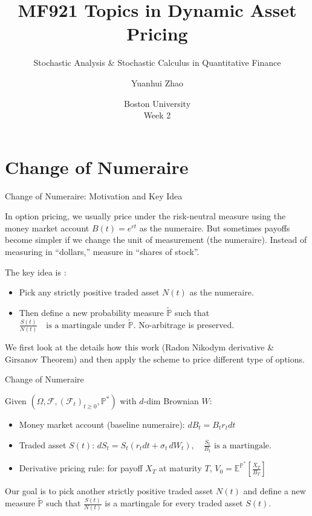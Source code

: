 \documentclass{beamer}
\title{MF921 Topics in Dynamic Asset Pricing}
\subtitle{Stochastic Analysis \& Stochastic Calculus in Quantitative Finance}
\author{Yuanhui Zhao}
\date{Boston University\\Week 2}
\begin{document}
\frame{\titlepage}
\section{Change of Numeraire}
\begin{frame}{Change of Numeraire: Motivation and Key Idea}
    \par In option pricing, we usually price under the risk-neutral measure using 
    the money market account $B(t) = e^{rt}$ as the numeraire. 
    But sometimes payoffs become simpler if we change the unit of measurement (the numeraire).
    Instead of measuring in “dollars,” measure in “shares of stock”.
    \vspace{1em}
    \par The key idea is :
    \begin{itemize}
        \item Pick any strictly positive traded asset $N(t)$ as the numeraire.
        \item Then define a new probability measure $\tilde{\mathbb{P}}$ such that 
        $\frac{S(t)}{N(t)} \quad \text{is a martingale under } \tilde{\mathbb{P}}.$ No-arbitrage is preserved.
    \end{itemize}
    \vspace{1em}
    \par We first look at the details how this work (Radon Nikodym derivative \& Girsanov Theorem) and 
    then apply the scheme to price different type of options. 
\end{frame}
\begin{frame}{Change of Numeraire}
    \par Given $(\Omega, \mathcal{F}, (\mathcal{F}_t)_{t \geq 0}, \mathbb{P}^*)$ with $d$-dim Brownian $W$:
    \vspace{1em}
    \begin{itemize}
        \item Money market account (baseline numeraire): $ dB_t =  B_t r_t dt$
        \item Traded asset $S(t)$: $dS_t = S_t(r_t dt + \sigma_t\, dW_t),
    \quad \tfrac{S_t}{B_t} \text{ is a martingale.}$
        \item Derivative pricing rule: for payoff $X_T$ at maturity $T$, $V_0 = \mathbb{E}^{\mathbb{P}^*}\left[\frac{X_T}{B_T}\right]$
    \end{itemize}
    \vspace{1em}
    \par Our goal is to pick another strictly positive traded asset $N(t)$ and
  define a new measure $\tilde{\mathbb{P}}$ such that $\frac{S(t)}{N(t)}$ is a martingale for every traded asset $S(t)$.
\end{frame}
\end{document}
